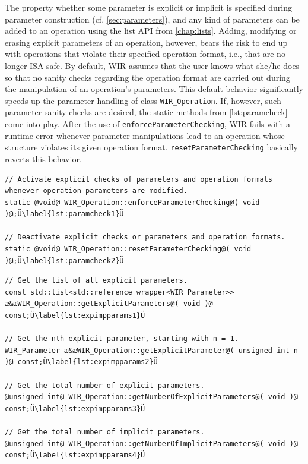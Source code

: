 The property whether some parameter is explicit or implicit is specified during parameter construction (cf. \cref{sec:parameters}), and any kind of parameters can be added to an operation using the list \gls{API} from \cref{chap:lists}.
Adding, modifying or erasing explicit parameters of an operation, however, bears the risk to end up with operations that violate their specified operation format, i.e., that are no longer \gls{ISA}-safe.
By default, \gls{WIR} assumes that the user knows what she/he does so that no sanity checks regarding the operation format are carried out during the manipulation of an operation's parameters.
This default behavior significantly speeds up the parameter handling of class \texttt{WIR\_Operation}.
If, however, such parameter sanity checks are desired, the static methods from \cref{lst:paramcheck} come into play.
After the use of \texttt{enforceParameterChecking}, \gls{WIR} fails with a runtime error whenever parameter manipulations lead to an operation whose structure violates its given operation format.
\texttt{resetParameterChecking} basically reverts this behavior.

\begin{lstlisting}[style=code,float=h,caption={Parameter Checking of Class \texttt{WIR\_Operation}},label=lst:paramcheck]
// Activate explicit checks of parameters and operation formats whenever operation parameters are modified.
static @void@ WIR_Operation::enforceParameterChecking@( void )@;Ü\label{lst:paramcheck1}Ü

// Deactivate explicit checks or parameters and operation formats.
static @void@ WIR_Operation::resetParameterChecking@( void )@;Ü\label{lst:paramcheck2}Ü
\end{lstlisting}

\begin{lstlisting}[style=code,float=t,caption={Explicit and Implicit Parameter Handling of Class \texttt{WIR\_Operation}},label=lst:expimpparams]
// Get the list of all explicit parameters.
const std::list<std::reference_wrapper<WIR_Parameter>> æ&æWIR_Operation::getExplicitParameters@( void )@ const;Ü\label{lst:expimpparams1}Ü

// Get the nth explicit parameter, starting with n = 1.
WIR_Parameter æ&æWIR_Operation::getExplicitParameter@( unsigned int n )@ const;Ü\label{lst:expimpparams2}Ü

// Get the total number of explicit parameters.
@unsigned int@ WIR_Operation::getNumberOfExplicitParameters@( void )@ const;Ü\label{lst:expimpparams3}Ü

// Get the total number of implicit parameters.
@unsigned int@ WIR_Operation::getNumberOfImplicitParameters@( void )@ const;Ü\label{lst:expimpparams4}Ü
\end{lstlisting}

